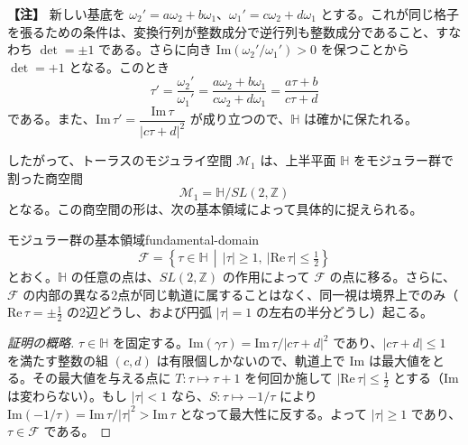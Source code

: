 \documentclass[uplatex, dvipdfmx, book]{jsbook}
\newenvironment{note}{\vspace{1ex}\par\footnotesize\noindent\textbf{【注】}}{\par\vspace{1ex}}
\begin{document}
\begin{note}
新しい基底を $\omega_2' = a\omega_2 + b\omega_1$、$\omega_1' = c\omega_2 + d\omega_1$ とする。これが同じ格子を張るための条件は、変換行列が整数成分で逆行列も整数成分であること、すなわち $\det = \pm 1$ である。さらに向き $\mathrm{Im}(\omega_2'/\omega_1') > 0$ を保つことから $\det = +1$ となる。このとき
\begin{equation*}
    \tau' = \frac{\omega_2'}{\omega_1'} = \frac{a\omega_2 + b\omega_1}{c\omega_2 + d\omega_1} = \frac{a\tau + b}{c\tau + d}
\end{equation*}
である。また、$\mathrm{Im}\,\tau' = \dfrac{\mathrm{Im}\,\tau}{|c\tau + d|^2}$ が成り立つので、$\mathbb{H}$ は確かに保たれる。
\end{note}

したがって、トーラスのモジュライ空間 $\mathcal{M}_{1}$ は、上半平面 $\mathbb{H}$ をモジュラー群で割った商空間
\begin{equation}
    \mathcal{M}_{1} = \mathbb{H} / SL(2, \mathbb{Z})
\end{equation}
となる。この商空間の形は、次の基本領域によって具体的に捉えられる。

\begin{myprop}{モジュラー群の基本領域}{fundamental-domain}
\begin{equation*}
    \mathcal{F} = \left\{ \tau \in \mathbb{H} \,\middle|\, |\tau| \ge 1,\ |\mathrm{Re}\,\tau| \le \tfrac{1}{2} \right\}
\end{equation*}
とおく。$\mathbb{H}$ の任意の点は、$SL(2, \mathbb{Z})$ の作用によって $\mathcal{F}$ の点に移る。さらに、$\mathcal{F}$ の内部の異なる2点が同じ軌道に属することはなく、同一視は境界上でのみ（$\mathrm{Re}\,\tau = \pm\frac12$ の2辺どうし、および円弧 $|\tau| = 1$ の左右の半分どうし）起こる。
\end{myprop}

\begin{proof}[証明の概略]
$\tau \in \mathbb{H}$ を固定する。$\mathrm{Im}(\gamma\tau) = \mathrm{Im}\,\tau / |c\tau + d|^2$ であり、$|c\tau + d| \le 1$ を満たす整数の組 $(c, d)$ は有限個しかないので、軌道上で $\mathrm{Im}$ は最大値をとる。その最大値を与える点に $T: \tau \mapsto \tau + 1$ を何回か施して $|\mathrm{Re}\,\tau| \le \frac12$ とする（$\mathrm{Im}$ は変わらない）。もし $|\tau| < 1$ なら、$S: \tau \mapsto -1/\tau$ により $\mathrm{Im}(-1/\tau) = \mathrm{Im}\,\tau/|\tau|^2 > \mathrm{Im}\,\tau$ となって最大性に反する。よって $|\tau| \ge 1$ であり、$\tau \in \mathcal{F}$ である。
\end{proof}
\end{document}
